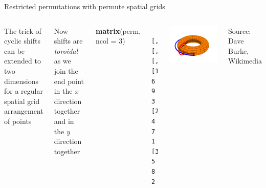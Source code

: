 \documentclass[10pt,ignorenonframetext,compress, aspectratio=169]{beamer}
\newenvironment{Shaded}{\begin{snugshade}}{\end{snugshade}}
\newcommand{\KeywordTok}[1]{\textcolor[rgb]{0.13,0.29,0.53}{\textbf{{#1}}}}
\newcommand{\DataTypeTok}[1]{\textcolor[rgb]{0.13,0.29,0.53}{{#1}}}
\newcommand{\DecValTok}[1]{\textcolor[rgb]{0.00,0.00,0.81}{{#1}}}
\newcommand{\NormalTok}[1]{{#1}}
\newcommand{\columnsbegin}{\begin{columns}}
\newcommand{\columnsend}{\end{columns}}
\begin{document}
\begin{frame}[fragile]{Restricted permutations with permute \textbar{}
spatial grids}

\columnsbegin
{} The trick of cyclic shifts can be extended to two
dimensions for a regular spatial grid arrangement of points

Now shifts are \emph{toroidal} as we join the end point in the \emph{x}
direction together and in the \emph{y} direction together

\scriptsize

\begin{Shaded}
\begin{Highlighting}[]
\KeywordTok{matrix}\NormalTok{(perm, }\DataTypeTok{ncol =} \DecValTok{3}\NormalTok{)}
\end{Highlighting}
\end{Shaded}

\begin{verbatim}
     [,1] [,2] [,3]
[1,]    6    9    3
[2,]    4    7    1
[3,]    5    8    2
\end{verbatim}

\normalsize

\includegraphics[width=\linewidth]{Toroidal_coord}

Source: Dave Burke, Wikimedia \ccby
\columnsend

\end{frame}
\end{document}
